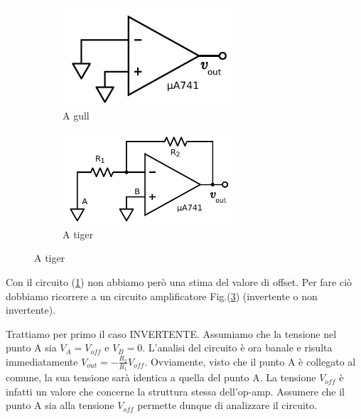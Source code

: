 \begin{figure}[ht]
        \centering
        \begin{subfigure}[b]{0.35\textwidth}
                 \includegraphics[width=0.70\textwidth]{../E02/latex/open_loop.pdf}
                \caption{A gull}
                \label{cir:open_loop}
        \end{subfigure}%
    \quad
        \begin{subfigure}[b]{0.35\textwidth}
               \includegraphics[width=0.70\textwidth]{../E02/latex/inv.pdf}
                \caption{A tiger}
                \label{cir:inv}
        \end{subfigure}
     
\end{figure}





Con il circuito (\ref{cir:open_loop}) non abbiamo però una stima del valore di offset. Per fare ciò dobbiamo ricorrere a un circuito amplificatore Fig.(\ref{cir:inv}) (invertente o non invertente).




Trattiamo per primo il caso INVERTENTE. Assumiamo che la tensione nel punto A sia $V_A=V_{off}$ e $V_B=0$. L'analisi del circuito è ora banale e risulta immediatamente $V_{out}=-\frac{R_2}{R_1}V_{off}$. Ovviamente, visto che il punto A è collegato al comune, la sua tensione sarà identica a quella del punto A. La tensione $V_{off}$ è infatti un valore che concerne la struttura stessa dell'op-amp. Assumere che il punto A sia alla tensione $V_{off}$ permette dunque di analizzare il circuito. 

